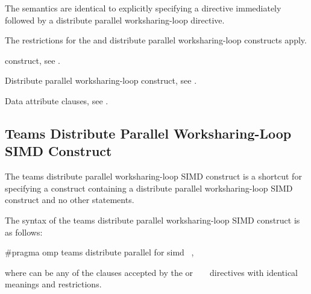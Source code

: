 \descr
The semantics are identical to explicitly specifying a  directive 
immediately followed by a distribute parallel worksharing-loop directive.

\restrictions
The restrictions for the  and distribute parallel worksharing-loop 
constructs apply.

\begin{crossrefs}
\item {} construct, see
.

\item Distribute parallel worksharing-loop construct, see
.

\item Data attribute clauses, see
.
\end{crossrefs}



\subsection{Teams Distribute Parallel Worksharing-Loop SIMD Construct}
\label{subsec:Teams Distribute Parallel Worksharing-Loop SIMD Construct}
\summary
The teams distribute parallel worksharing-loop SIMD construct is a shortcut 
for specifying a  construct containing a distribute parallel 
worksharing-loop SIMD construct and no other statements.

\syntax
\begin{ccppspecific}
The syntax of the teams distribute parallel worksharing-loop SIMD construct 
is as follows:

\begin{ompcPragma}
#pragma omp teams distribute parallel for simd \
            \plc{[clause[ [},\plc{] clause] ... ] new-line}
\end{ompcPragma}

where  can be any of the clauses accepted by the  or
\code{distribute}~\code{parallel} \code{for}~\code{simd} directives with 
identical meanings and restrictions.
\end{ccppspecific}

